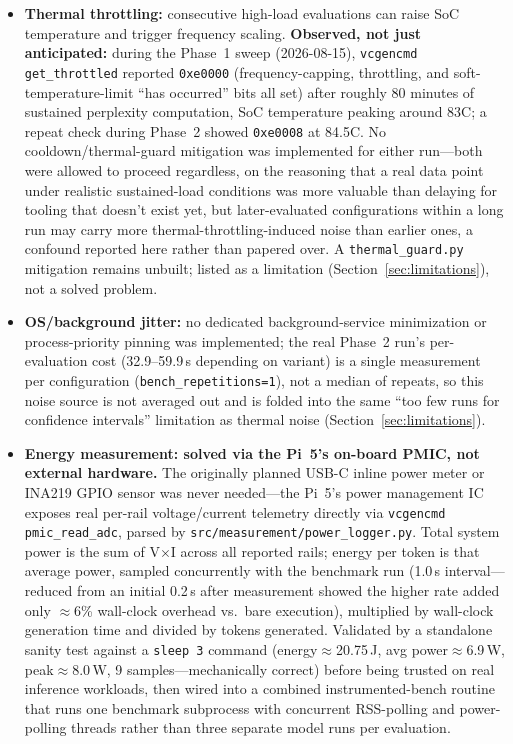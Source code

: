 \documentclass[journal]{IEEEtran}
\begin{document}
\begin{itemize}
  \item \textbf{Thermal throttling:} consecutive high-load evaluations can raise SoC temperature and trigger frequency scaling. \textbf{Observed, not just anticipated:} during the Phase~1 sweep (2026-08-15), \texttt{vcgencmd get\_throttled} reported \texttt{0xe0000} (frequency-capping, throttling, and soft-temperature-limit ``has occurred'' bits all set) after roughly 80 minutes of sustained perplexity computation, SoC temperature peaking around 83\textdegree C; a repeat check during Phase~2 showed \texttt{0xe0008} at 84.5\textdegree C. No cooldown/thermal-guard mitigation was implemented for either run---both were allowed to proceed regardless, on the reasoning that a real data point under realistic sustained-load conditions was more valuable than delaying for tooling that doesn't exist yet, but later-evaluated configurations within a long run may carry more thermal-throttling-induced noise than earlier ones, a confound reported here rather than papered over. A \texttt{thermal\_guard.py} mitigation remains unbuilt; listed as a limitation (Section~\ref{sec:limitations}), not a solved problem.
  \item \textbf{OS/background jitter:} no dedicated background-service minimization or process-priority pinning was implemented; the real Phase~2 run's per-evaluation cost (32.9--59.9\,s depending on variant) is a single measurement per configuration (\texttt{bench\_repetitions=1}), not a median of repeats, so this noise source is not averaged out and is folded into the same ``too few runs for confidence intervals'' limitation as thermal noise (Section~\ref{sec:limitations}).
  \item \textbf{Energy measurement: solved via the Pi~5's on-board PMIC, not external hardware.} The originally planned USB-C inline power meter or INA219 GPIO sensor was never needed---the Pi~5's power management IC exposes real per-rail voltage/current telemetry directly via \texttt{vcgencmd pmic\_read\_adc}, parsed by \texttt{src/measurement/power\_logger.py}. Total system power is the sum of V$\times$I across all reported rails; energy per token is that average power, sampled concurrently with the benchmark run (1.0\,s interval---reduced from an initial 0.2\,s after measurement showed the higher rate added only $\approx$6\% wall-clock overhead vs.\ bare execution), multiplied by wall-clock generation time and divided by tokens generated. Validated by a standalone sanity test against a \texttt{sleep 3} command (energy$\approx$20.75\,J, avg power$\approx$6.9\,W, peak$\approx$8.0\,W, 9 samples---mechanically correct) before being trusted on real inference workloads, then wired into a combined instrumented-bench routine that runs one benchmark subprocess with concurrent RSS-polling and power-polling threads rather than three separate model runs per evaluation.
\end{itemize}
\end{document}
